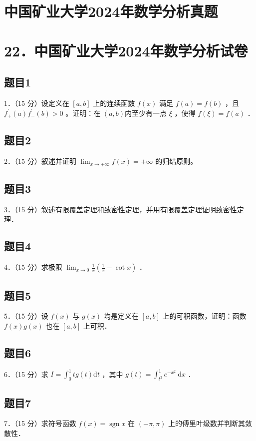\documentclass{article}
\begin{document}
\section*{中国矿业大学2024年数学分析真题}
\section*{22．中国矿业大学2024年数学分析试卷}

\subsection{题目1}
1．（15 分）设定义在 \([a, b]\) 上的连续函数 \(f(x)\) 满足 \(f(a)=f(b)\) ，且 \(f_{+}^{\prime}(a) f_{-}^{\prime}(b)>0\) 。证明：在 \((a, b)\)内至少有一点 \(\xi\) ，使得 \(f(\xi)=f(a)\) ．

\subsection{题目2}
2．（15 分）叙述并证明 \(\lim _{x \rightarrow+\infty} f(x)=+\infty\) 的归结原则。

\subsection{题目3}
3．（15 分）叙述有限覆盖定理和致密性定理，并用有限覆盖定理证明致密性定理．

\subsection{题目4}
4．（15 分）求极限 \(\lim _{x \rightarrow 0} \frac{1}{x}\left(\frac{1}{x}-\cot x\right)\) ．

\subsection{题目5}
5．（15 分）设 \(f(x)\) 与 \(g(x)\) 均是定义在 \([a, b]\) 上的可积函数，证明：函数 \(f(x) g(x)\) 也在 \([a, b]\) 上可积．

\subsection{题目6}
6．（15 分）求 \(I=\int_{0}^{1} t g(t) \mathrm{d} t\) ，其中 \(g(t)=\int_{t^{2}}^{1} e^{-x^{2}} \mathrm{~d} x\) ．

\subsection{题目7}
7．（15 分）求符号函数 \(f(x)=\operatorname{sgn} x\) 在 \((-\pi, \pi)\) 上的傅里叶级数并判断其敛散性．
\end{document}
